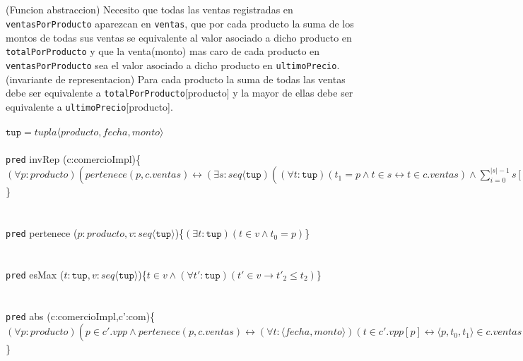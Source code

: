 \documentclass{article}
\newcommand{\invRep}[2]{\noindent\texttt{pred} invRep (#1)\{$#2$\}\\}
\newcommand{\abst}[2]{\noindent\texttt{pred} abs (#1)\{$#2$\}\\}
\newcommand{\pred}[3]{\noindent\texttt{pred} #1 (#2)\{$#3$\}\\}
\begin{document}
\\\\
\section{}

(Funcion abstraccion) Necesito que todas las ventas registradas en \texttt{ventasPorProducto} aparezcan en \texttt{ventas}, que por cada
producto la suma de los montos de todas sus ventas se equivalente al valor asociado
a dicho producto en \texttt{totalPorProducto} y que la venta(monto) mas caro de cada producto en \texttt{ventasPorProducto}
sea el valor asociado a dicho producto en \texttt{ultimoPrecio}.\\
(invariante de representacion) Para cada producto la suma de todas las ventas debe ser equivalente a 
\texttt{totalPorProducto}[producto] y la mayor de ellas debe ser equivalente a \texttt{ultimoPrecio}[producto].\\\\


$\texttt{tup}=tupla\langle producto,fecha,monto\rangle$\\\\

\invRep{c:comercioImpl}{(\forall p:producto)(pertenece(p,c.ventas)\leftrightarrow 
(\exists s:seq\langle \texttt{tup})((\forall t:\texttt{tup})(t_1=p \land t\in s \leftrightarrow 
t\in c.ventas)\land \displaystyle\sum_{i=0}^{|s|-1}s[i]_2 = c.totalPorProducto[p]\land (\exists m:\texttt{tup})(esMax(m,s)\land t_2=ultimoPrecio[p])))}\\\\

\pred{pertenece}{$p:producto,v:seq\langle\texttt{tup}\rangle$}{(\exists t:\texttt{tup})(t\in v \land t_0=p)}\\\\

\pred{esMax}{$t:\texttt{tup},v:seq\langle\texttt{tup}\rangle$}{t\in v \land (\forall t':\texttt{tup})(t'\in v \to t'_2\leq t_2)}\\\\


\abst{c:comercioImpl,c':com}{(\forall p:producto)(p\in c'.vpp\land pertenece(p,c.ventas)\leftrightarrow (\forall t:\langle fecha,monto\rangle)
(t\in c'.vpp[p]\leftrightarrow \langle p,t_0,t_1 \rangle\in c.ventas\land (\exists t':\langle fecha,monto\rangle)(t'\in c'.vpp[p]\land t'_0\geq t_0 \land t'_1=c.ultimoPrecio[p]))\land
\displaystyle\sum_{i=0}^{|c'.vpp[p]|-1}c'.vpp[p][i][1]=c.totalPorProducto[p])}
\end{document}
